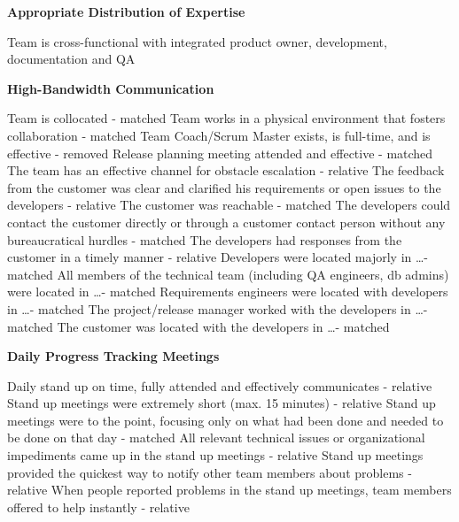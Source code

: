 \begin{appendices}
\textbf{Appropriate Distribution of Expertise}
\begin{itemize}
	\taa Team is cross-functional with integrated product owner, development, documentation and QA
\end{itemize}

\textbf{High-Bandwidth Communication}
\begin{itemize}
	\taa Team is collocated - matched
	\taa Team works in a physical environment that fosters collaboration - matched
	\taa Team Coach/Scrum Master exists, is full-time, and is effective - removed
	\taa Release planning meeting attended and effective - matched
	\taar The team has an effective channel for obstacle escalation - relative
	\pam The feedback from the customer was clear and clarified his requirements or open issues to the developers - relative
	\pam The customer was reachable - matched
	\pam The developers could contact the customer directly or through a customer contact person without any bureaucratical hurdles - matched
	\pam The developers had responses from the customer in a timely manner - relative
	\pam Developers were located majorly in \ldots - matched
	\pam All members of the technical team (including QA engineers, db admins) were located in \ldots - matched
	\pam Requirements engineers were located with developers in \ldots - matched
	\pam The project/release manager worked with the developers in \ldots - matched
	\pam The customer was located with the developers in \ldots - matched
\end{itemize}

\textbf{Daily Progress Tracking Meetings}
\begin{itemize}
	\taa Daily stand up on time, fully attended and effectively communicates - relative
	\pam Stand up meetings were extremely short (max. 15 minutes) - relative
	\pam Stand up meetings were to the point, focusing only on what had been done and needed to be done on that day - matched
	\pamr All relevant technical issues or organizational impediments came up in the stand up meetings - relative
	\pamr Stand up meetings provided the quickest way to notify other team members about problems - relative
	\pamr When people reported problems in the stand up meetings, team members offered to help instantly - relative
\end{itemize}


\end{appendices}
